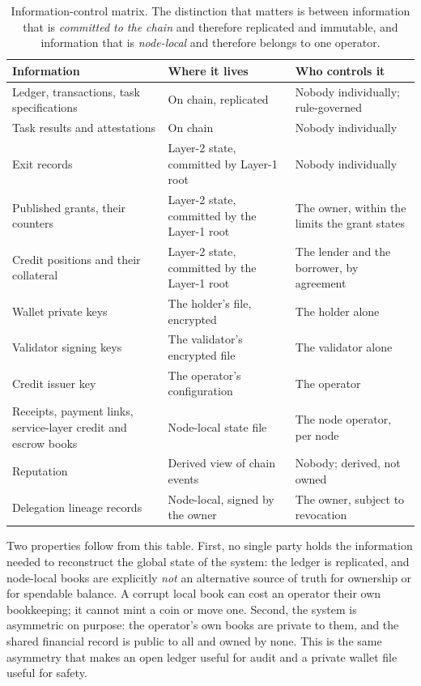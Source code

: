 \documentclass{article}
\begin{document}
\begin{table}[t]
\centering
\begin{tabular}{@{}p{}p{}p{}@{}}
\toprule
\textbf{Information} & \textbf{Where it lives} & \textbf{Who controls it} \\
\midrule
Ledger, transactions, task
  specifications & On chain, replicated & Nobody individually; rule-governed \\
Task results and attestations & On chain & Nobody individually \\
Exit records & Layer-2 state, committed by
  Layer-1 root & Nobody individually \\
Published grants, their counters & Layer-2 state, committed by
  the Layer-1 root & The owner, within the limits the grant states \\
Credit positions and their collateral & Layer-2 state, committed by
  the Layer-1 root & The lender and the borrower, by agreement \\
Wallet private keys & The holder's file, encrypted & The holder alone \\
Validator signing keys & The validator's encrypted file & The validator
  alone \\
Credit issuer key & The operator's configuration & The operator \\
Receipts, payment links, service-layer
  credit and escrow books & Node-local state file & The node operator, per node \\
Reputation & Derived view of chain events & Nobody; derived, not owned \\
Delegation lineage records & Node-local, signed by the owner & The owner,
  subject to revocation \\
\bottomrule
\end{tabular}
\caption{Information-control matrix. The distinction that matters is between
information that is \emph{committed to the chain} and therefore replicated and
immutable, and information that is \emph{node-local} and therefore belongs to
one operator.}
\label{tab:info}
\end{table}

Two properties follow from this table. First, no single party holds the
information needed to reconstruct the global state of the system: the ledger is
replicated, and node-local books are explicitly \emph{not} an alternative
source of truth for ownership or for spendable balance. A corrupt local book
can cost an operator their own bookkeeping; it cannot mint a coin or move one.
Second, the system is asymmetric on purpose: the operator's own books are
private to them, and the shared financial record is public to all and owned by
none. This is the same asymmetry that makes an open ledger useful for audit
and a private wallet file useful for safety.
\end{document}
